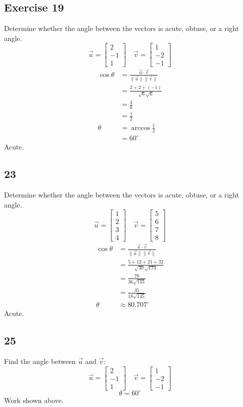 \documentclass[letterpaper, 12pt]{math}
\begin{document}
\subsection*{Exercise 19}
Determine whether the angle between the vectors is acute, obtuse, or a right
angle.
\[ \vec{u} = \begin{bmatrix}2 \\ -1 \\ 1\end{bmatrix} \quad
  \vec{v} = \begin{bmatrix}1 \\ -2 \\ -1\end{bmatrix} \]
\begin{align*}
  \cos\theta &= \frac{\vec{u}\cdot\vec{v}}{\|\vec{u}\|\|\vec{v}\|} \\
  &= \frac{2+2+(-1)}{\sqrt{6}\sqrt{6}} \\
  &= \frac{3}{6} \\
  &= \frac{1}{2} \\
  \theta &= \arccos\frac{1}{2} \\
  &= 60^{\circ}
\end{align*}
Acute.

\subsection*{23}
Determine whether the angle between the vectors is acute, obtuse, or a right
angle.
\[ \vec{u} = \begin{bmatrix}1 \\ 2 \\ 3 \\ 4\end{bmatrix} \quad
  \vec{v} = \begin{bmatrix}5 \\ 6 \\ 7 \\ 8\end{bmatrix} \]
\begin{align*}
  \cos\theta &= \frac{\vec{u}\cdot\vec{v}}{\|\vec{u}\|\|\vec{v}\|} \\
  &= \frac{5+12+21+32}{\sqrt{30}\sqrt{174}} \\
  &= \frac{70}{36\sqrt{145}} \\
  &= \frac{35}{18\sqrt{145}} \\
  \theta &\approx 80.707^{\circ}
\end{align*}
Acute.

\subsection*{25}
Find the angle between \( \vec{u} \) and \( \vec{v} \):
\[ \vec{u} = \begin{bmatrix}2 \\ -1 \\ 1\end{bmatrix} \quad
  \vec{v} = \begin{bmatrix}1 \\ -2 \\ -1\end{bmatrix} \]
\[ \theta = 60^{\circ} \]
Work shown above.
\end{document}

